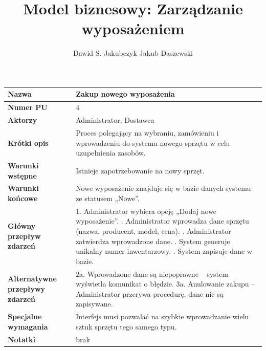 \documentclass{article}
\title{Model biznesowy: Zarządzanie wyposażeniem}
\author{Dawid S. Jakubczyk Jakub Daszewski}
\date{}
\begin{document}
    \maketitle

    \begin{tabular}{|m{10em}|m{20em}|}
        \hline
        \textbf{Nazwa} & Zakup nowego wyposażenia \\
        \hline
        \textbf{Numer PU} & 4 \\
        \hline
        \textbf{Aktorzy} & Administrator, Dostawca \\
        \hline
        \textbf{Krótki opis} & Proces polegający na wybraniu, zamówieniu i wprowadzeniu do systemu nowego sprzętu w celu uzupełnienia zasobów. \\
        \hline
        \textbf{Warunki wstępne} & Istnieje zapotrzebowanie na nowy sprzęt. \\
        \hline
        \textbf{Warunki końcowe} & Nowe wyposażenie znajduje się w bazie danych systemu ze statusem „Nowe”. \\
        \hline
        \textbf{Główny przepływ zdarzeń} & 
            1. Administrator wybiera opcję „Dodaj nowe wyposażenie”. \newline
            2. Administrator wprowadza dane sprzętu (nazwa, producent, model, cena). \newline
            3. Administrator zatwierdza wprowadzone dane. \newline
            4. System generuje unikalny numer inwentarzowy. \newline
            5. System zapisuje dane w bazie. \\
        \hline
        \textbf{Alternatywne przepływy zdarzeń} & 
            2a. Wprowadzone dane są niepoprawne – system wyświetla komunikat o błędzie. \newline
            3a. Anulowanie zakupu – Administrator przerywa procedurę, dane nie są zapisywane. \\
        \hline
        \textbf{Specjalne wymagania} & Interfejs musi pozwalać na szybkie wprowadzanie wielu sztuk sprzętu tego samego typu. \\
        \hline
        \textbf{Notatki} & brak \\
        \hline
    \end{tabular}

    \vspace{1cm} %
\end{document}
